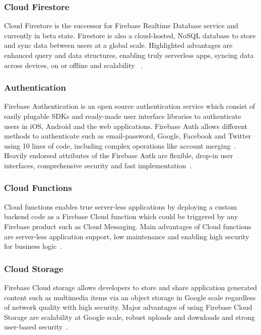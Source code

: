 \subsubsection{Cloud Firestore} Cloud Firestore is the successor for Firebase
Realtime Database service and currently in beta state. Firestore is also a
cloud-hosted, NoSQL database to store and sync data between users at a global
scale. Highlighted advantages are enhanced query and data structures, enabling
truly serverless apps,  syncing data across devices, on or offline and
scalability ~\cite{hid-sp18-409-www-firebase-official,
	hid-sp18-409-www-firebase-products}.

\subsubsection{Authentication} Firebase Authentication is an open source
authentication service which consist of easily plugable SDKs and ready-made user
interface libraries to authenticate users in iOS, Android and the web
applications. Firebase Auth allows different methods to authenticate such as
email-password, Google, Facebook and Twitter using 10 lines of code, including
complex operations like account
merging~\cite{hid-sp18-409-www-firebase-products}. Heavily endorsed attributes
of the Firebase Auth are flexible, drop-in user interfaces, comprehensive
security and fast implementation~\cite{hid-sp18-409-www-firebase-wikipedia}.

\subsubsection{Cloud Functions} Cloud functions enables true server-less
applications by deploying a custom backend code as a Firebase Cloud function
which could be triggered by any Firebase product such as Cloud Messaging. Main
advantages of Cloud functions are server-less application support, low
maintenance and enabling high security for business
logic~\cite{hid-sp18-409-www-firebase-products}.

\subsubsection{Cloud Storage} Firebase Cloud storage allows developers to store
and share application generated content such as multimedia items via an object
storage in Google scale regardless of network quality with high security. Major
advantages of using Firebase Cloud Storage are scalability at Google scale,
robust uploads and downloads and strong user-based
security~\cite{hid-sp18-409-www-firebase-products}.

